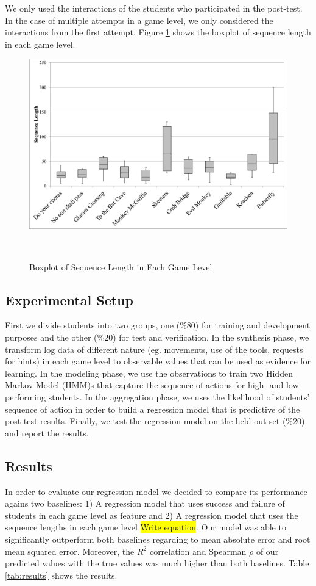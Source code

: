 \documentclass{sigchi}
\newcommand{\hl}[1]{\colorbox{yellow}{#1}}
\begin{document}
We only used the interactions of the students who participated in the post-test.
In the case of multiple attempts in a game level, we only considered the interactions from the first attempt.
Figure \ref{fig:boxplot} shows the boxplot of sequence length in each game level. 

\begin{figure}
	\centering
	\includegraphics[width=0.9\columnwidth]{figures/boxplot}
	\caption{Boxplot of Sequence Length in Each Game Level}~\label{fig:boxplot}
\end{figure}

\subsection{Experimental Setup}
First we divide students into two groups, one (\%80) for training and development purposes and the other (\%20) for test and verification.
In the synthesis phase, we transform log data of different nature (eg. movements, use of the tools, requests for hints) in each game level to observable values that can be used as evidence for learning.
In the modeling phase, we use the observations to train two Hidden Markov Model (HMM)s that capture the sequence of actions for high- and low-performing students.
In the aggregation phase, we uses the likelihood of students' sequence of action in order to build a regression model that is predictive of the post-test results.
Finally, we test the regression model on the held-out set (\%20) and report the results.


\subsection{Results}
In order to evaluate our regression model we decided to compare its performance agains two baselines: 1) A regression model that uses success and failure of students in each game level as feature and 2) A regression model that uses the sequence lengths in each game level \hl{Write equation}. 
Our model was able to significantly outperform both baselines regarding to mean absolute error and root mean squared error. 
Moreover, the $R^2$ correlation and Spearman $\rho$ of our predicted values with the true values was much higher than both baselines. 
Table \ref{tab:results} shows the results. 
\end{document}
